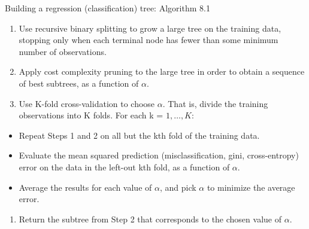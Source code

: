 \documentclass[ignorenonframetext,]{beamer}
\providecommand{\tightlist}{%
  \setlength{\itemsep}{0pt}\setlength{\parskip}{0pt}}
\begin{document}
\begin{frame}

\begin{block}{Building a regression (classification) tree: Algorithm
8.1}

\begin{enumerate}
\def\labelenumi{\arabic{enumi}.}
\tightlist
\item
  Use recursive binary splitting to grow a large tree on the training
  data, stopping only when each terminal node has fewer than some
  minimum number of observations.
\item
  Apply cost complexity pruning to the large tree in order to obtain a
  sequence of best subtrees, as a function of \(\alpha\).
\item
  Use K-fold cross-validation to choose \(\alpha\). That is, divide the
  training observations into K folds. For each k = \(1,\ldots, K\):
\end{enumerate}

\begin{itemize}
\tightlist
\item
  Repeat Steps 1 and 2 on all but the kth fold of the training data.
\item
  Evaluate the mean squared prediction (misclassification, gini,
  cross-entropy) error on the data in the left-out kth fold, as a
  function of \(\alpha\).
\item
  Average the results for each value of \(\alpha\), and pick \(\alpha\)
  to minimize the average error.
\end{itemize}

\begin{enumerate}
\def\labelenumi{\arabic{enumi}.}
\setcounter{enumi}{3}
\tightlist
\item
  Return the subtree from Step 2 that corresponds to the chosen value of
  \(\alpha\).
\end{enumerate}

\end{block}

\end{frame}
\end{document}
